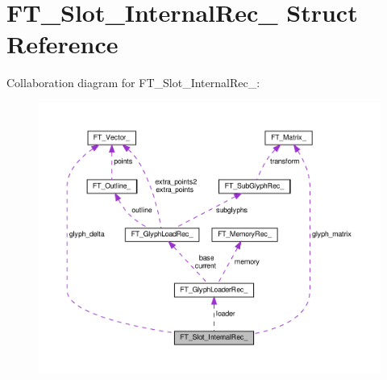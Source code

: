 \hypertarget{structFT__Slot__InternalRec__}{}\section{F\+T\+\_\+\+Slot\+\_\+\+Internal\+Rec\+\_\+ Struct Reference}
\label{structFT__Slot__InternalRec__}


Collaboration diagram for F\+T\+\_\+\+Slot\+\_\+\+Internal\+Rec\+\_\+\+:
\nopagebreak
\begin{figure}[H]
\begin{center}
\leavevmode
\includegraphics[width=350pt]{structFT__Slot__InternalRec____coll__graph}
\end{center}
\end{figure}
